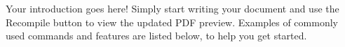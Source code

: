 Your introduction goes here! Simply start writing your document and use the Recompile button to view the updated PDF preview. Examples of commonly used commands and features are listed below, to help you get started.
